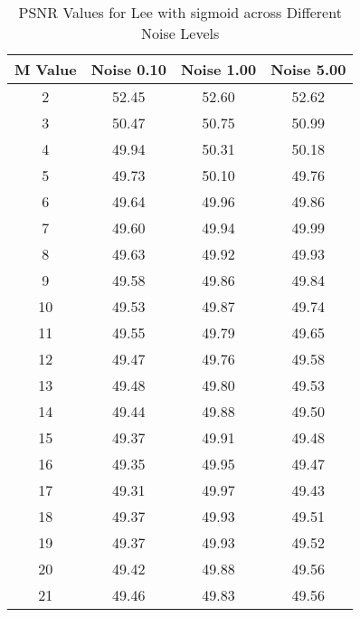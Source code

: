 \begin{table}[htb]
\small
\centering
\begin{tabular}{|c|c|c|c|} \hline
M Value & Noise 0.10 & Noise 1.00 & Noise 5.00 \\ \hline
2 & 52.45 & 52.60 & 52.62 \\ \hline
3 & 50.47 & 50.75 & 50.99 \\ \hline
4 & 49.94 & 50.31 & 50.18 \\ \hline
5 & 49.73 & 50.10 & 49.76 \\ \hline
6 & 49.64 & 49.96 & 49.86 \\ \hline
7 & 49.60 & 49.94 & 49.99 \\ \hline
8 & 49.63 & 49.92 & 49.93 \\ \hline
9 & 49.58 & 49.86 & 49.84 \\ \hline
10 & 49.53 & 49.87 & 49.74 \\ \hline
11 & 49.55 & 49.79 & 49.65 \\ \hline
12 & 49.47 & 49.76 & 49.58 \\ \hline
13 & 49.48 & 49.80 & 49.53 \\ \hline
14 & 49.44 & 49.88 & 49.50 \\ \hline
15 & 49.37 & 49.91 & 49.48 \\ \hline
16 & 49.35 & 49.95 & 49.47 \\ \hline
17 & 49.31 & 49.97 & 49.43 \\ \hline
18 & 49.37 & 49.93 & 49.51 \\ \hline
19 & 49.37 & 49.93 & 49.52 \\ \hline
20 & 49.42 & 49.88 & 49.56 \\ \hline
21 & 49.46 & 49.83 & 49.56 \\ \hline
\end{tabular}
\caption{PSNR Values for Lee with sigmoid across Different Noise Levels}
\end{table}


